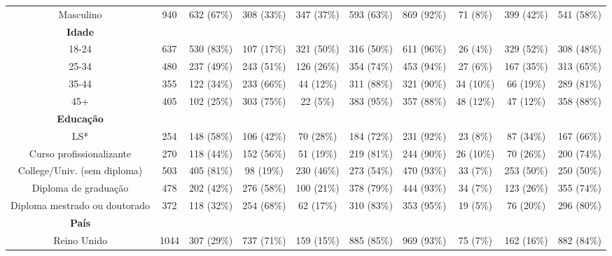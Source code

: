 \begin{landscape}
\begin{table}[h!]
\begin{tabular}{cccccccccc}
Masculino & 940 & 632 (67\%) & 308 (33\%) & 347 (37\%) & 593 (63\%) & 869 (92\%) & 71 (8\%) & 399 (42\%) & 541 (58\%) \\ \cline{1-10}
\textbf{Idade} & \multicolumn{1}{l}{} & \multicolumn{1}{l}{} & \multicolumn{1}{l}{} & \multicolumn{1}{l}{} & \multicolumn{1}{l}{} & \multicolumn{1}{l}{} & \multicolumn{1}{l}{} & \multicolumn{1}{l}{} & \multicolumn{1}{l}{} \\
18-24 & 637 & 530 (83\%) & 107 (17\%) & 321 (50\%) & 316 (50\%) & 611 (96\%) & 26 (4\%) & 329 (52\%) & 308 (48\%) \\
25-34 & 480 & 237 (49\%) & 243 (51\%) & 126 (26\%) & 354 (74\%) & 453 (94\%) & 27 (6\%) & 167 (35\%) & 313 (65\%) \\
35-44 & 355 & 122 (34\%) & 233 (66\%) & 44 (12\%) & 311 (88\%) & 321 (90\%) & 34 (10\%) & 66 (19\%) & 289 (81\%) \\
45+ & 405 & 102 (25\%) & 303 (75\%) & 22 (5\%) & 383 (95\%) & 357 (88\%) & 48 (12\%) & 47 (12\%) & 358 (88\%) \\ \cline{1-10}
\textbf{Educação} & \multicolumn{1}{l}{} & \multicolumn{1}{l}{} & \multicolumn{1}{l}{} & \multicolumn{1}{l}{} & \multicolumn{1}{l}{} & \multicolumn{1}{l}{} & \multicolumn{1}{l}{} & \multicolumn{1}{l}{} & \multicolumn{1}{l}{} \\
LS* & 254 & 148 (58\%) & 106 (42\%) & 70 (28\%) & 184 (72\%) & 231 (92\%) & 23 (8\%) & 87 (34\%) & 167 (66\%) \\
Curso profissionalizante & 270 & 118 (44\%) & 152 (56\%) & 51 (19\%) & 219 (81\%) & 244 (90\%) & 26 (10\%) & 70 (26\%) & 200 (74\%) \\
College/Univ. (sem diploma) & 503 & 405 (81\%) & 98 (19\%) & 230 (46\%) & 273 (54\%) & 470 (93\%) & 33 (7\%) & 253 (50\%) & 250 (50\%) \\
Diploma de graduação & 478 & 202 (42\%) & 276 (58\%) & 100 (21\%) & 378 (79\%) & 444 (93\%) & 34 (7\%) & 123 (26\%) & 355 (74\%) \\
Diploma mestrado ou doutorado & 372 & 118 (32\%) & 254 (68\%) & 62 (17\%) & 310 (83\%) & 353 (95\%) & 19 (5\%) & 76 (20\%) & 296 (80\%) \\ \cline{1-10}
\textbf{País} & \multicolumn{1}{l}{} & \multicolumn{1}{l}{} & \multicolumn{1}{l}{} & \multicolumn{1}{l}{} & \multicolumn{1}{l}{} & \multicolumn{1}{l}{} & \multicolumn{1}{l}{} & \multicolumn{1}{l}{} & \multicolumn{1}{l}{} \\
Reino Unido & 1044 & 307 (29\%) & 737 (71\%) & 159 (15\%) & 885 (85\%) & 969 (93\%) & 75 (7\%) & 162 (16\%) & 882 (84\%) \\

\end{tabular}
\end{table}
\end{landscape}
